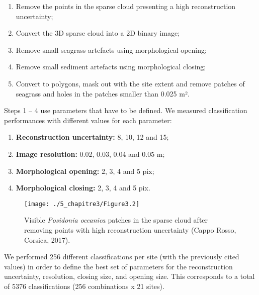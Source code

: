 \begin{enumerate}
\item Remove the points in the sparse cloud presenting a high reconstruction uncertainty;
\item Convert the 3D sparse cloud into a 2D binary image;
\item Remove small seagrass artefacts using morphological opening;
\item Remove small sediment artefacts using morphological closing;
\item Convert to polygons, mask out with the site extent and remove patches of seagrass and holes in the patches smaller than 0.025 m².
\end{enumerate}

Steps 1 – 4 use parameters that have to be defined. We measured classification performances with different values for each parameter:

\begin{enumerate}
\item \textbf{Reconstruction uncertainty:} 8, 10, 12 and 15;
\item \textbf{Image resolution:} 0.02, 0.03, 0.04 and 0.05 m;
\item \textbf{Morphological opening:} 2, 3, 4 and 5 pix;
\item \textbf{Morphological closing:} 2, 3, 4 and 5 pix.
\end{enumerate}

\begin{figure}[H]
	\begin{center}
	\texttt{[image: ./5\_chapitre3/Figure3.2]}
		\caption[Visible \textit{Posidonia oceanica} patches in the sparse cloud after removing points with high reconstruction uncertainty.]{Visible \textit{Posidonia oceanica} patches in the sparse cloud after removing points with high reconstruction uncertainty (Cappo Rosso, Corsica, 2017).}
	\label{figure3.2}
\end{center}
\end{figure}

We performed 256 different classifications per site (with the previously cited values) in order to define the best set of parameters for the reconstruction uncertainty, resolution, closing size, and opening size. This corresponds to a total of 5376 classifications (256 combinations x 21 sites).

